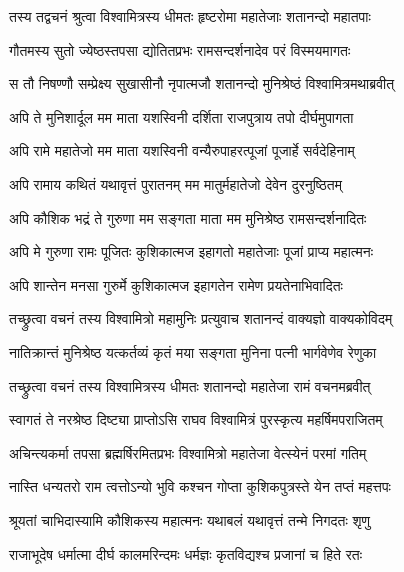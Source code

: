 
\twolineshloka
{तस्य तद्वचनं श्रुत्वा विश्वामित्रस्य धीमतः}
{हृष्टरोमा महातेजाः शतानन्दो महातपाः} %

\twolineshloka
{गौतमस्य सुतो ज्येष्ठस्तपसा द्योतितप्रभः}
{रामसन्दर्शनादेव परं विस्मयमागतः} %

\twolineshloka
{स तौ निषण्णौ सम्प्रेक्ष्य सुखासीनौ नृपात्मजौ}
{शतानन्दो मुनिश्रेष्ठं विश्वामित्रमथाब्रवीत्} %

\twolineshloka
{अपि ते मुनिशार्दूल मम माता यशस्विनी}
{दर्शिता राजपुत्राय तपो दीर्घमुपागता} %

\twolineshloka
{अपि रामे महातेजो मम माता यशस्विनी}
{वन्यैरुपाहरत्पूजां पूजार्हे सर्वदेहिनाम्} %

\twolineshloka
{अपि रामाय कथितं यथावृत्तं पुरातनम्}
{मम मातुर्महातेजो देवेन दुरनुष्ठितम्} %

\twolineshloka
{अपि कौशिक भद्रं ते गुरुणा मम सङ्गता}
{माता मम मुनिश्रेष्ठ रामसन्दर्शनादितः} %

\twolineshloka
{अपि मे गुरुणा रामः पूजितः कुशिकात्मज}
{इहागतो महातेजाः पूजां प्राप्य महात्मनः} %

\twolineshloka
{अपि शान्तेन मनसा गुरुर्मे कुशिकात्मज}
{इहागतेन रामेण प्रयतेनाभिवादितः} %

\twolineshloka
{तच्छ्रुत्वा वचनं तस्य विश्वामित्रो महामुनिः}
{प्रत्युवाच शतानन्दं वाक्यज्ञो वाक्यकोविदम्} %

\twolineshloka
{नातिक्रान्तं मुनिश्रेष्ठ यत्कर्तव्यं कृतं मया}
{सङ्गता मुनिना पत्नी भार्गवेणेव रेणुका} %

\twolineshloka
{तच्छ्रुत्वा वचनं तस्य विश्वामित्रस्य धीमतः}
{शतानन्दो महातेजा रामं वचनमब्रवीत्} %

\twolineshloka
{स्वागतं ते नरश्रेष्ठ दिष्ट्या प्राप्तोऽसि राघव}
{विश्वामित्रं पुरस्कृत्य महर्षिमपराजितम्} %

\twolineshloka
{अचिन्त्यकर्मा तपसा ब्रह्मर्षिरमितप्रभः}
{विश्वामित्रो महातेजा वेत्स्येनं परमां गतिम्} %

\twolineshloka
{नास्ति धन्यतरो राम त्वत्तोऽन्यो भुवि कश्चन}
{गोप्ता कुशिकपुत्रस्ते येन तप्तं महत्तपः} %

\twolineshloka
{श्रूयतां चाभिदास्यामि कौशिकस्य महात्मनः}
{यथाबलं यथावृत्तं तन्मे निगदतः शृणु} %

\twolineshloka
{राजाभूदेष धर्मात्मा दीर्घ कालमरिन्दमः}
{धर्मज्ञः कृतविद्यश्च प्रजानां च हिते रतः} %

